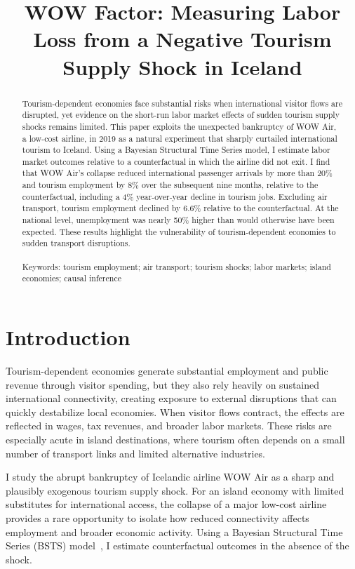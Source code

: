 \documentclass[12pt]{article}
\title{WOW Factor: Measuring Labor Loss from a Negative Tourism Supply Shock in Iceland}
\date{}
\begin{document}
\maketitle
\clearpage

\begin{abstract}
Tourism-dependent economies face substantial risks when international visitor flows are disrupted, yet evidence on the short-run labor market effects of sudden tourism supply shocks remains limited. This paper exploits the unexpected bankruptcy of WOW Air, a low-cost airline, in 2019 as a natural experiment that sharply curtailed international tourism to Iceland. Using a Bayesian Structural Time Series model, I estimate labor market outcomes relative to a counterfactual in which the airline did not exit. I find that WOW Air’s collapse reduced international passenger arrivals by more than 20\% and tourism employment by 8\% over the subsequent nine months, relative to the counterfactual, including a 4\% year-over-year decline in tourism jobs. Excluding air transport, tourism employment declined by 6.6\% relative to the counterfactual. At the national level, unemployment was nearly 50\% higher than would otherwise have been expected. These results highlight the vulnerability of tourism-dependent economies to sudden transport disruptions.
\\ 
\\
Keywords: tourism employment; air transport; tourism shocks; labor markets; island economies; causal inference
\end{abstract}
\clearpage

\section{Introduction}\label{sec:Introduction}
Tourism-dependent economies generate substantial employment and public revenue through visitor spending, but they also rely heavily on sustained international connectivity, creating exposure to external disruptions that can quickly destabilize local economies. When visitor flows contract, the effects are reflected in wages, tax revenues, and broader labor markets. These risks are especially acute in island destinations, where tourism often depends on a small number of transport links and limited alternative industries.

I study the abrupt bankruptcy of Icelandic airline WOW Air as a sharp and plausibly exogenous tourism supply shock. For an island economy with limited substitutes for international access, the collapse of a major low-cost airline provides a rare opportunity to isolate how reduced connectivity affects employment and broader economic activity. Using a Bayesian Structural Time Series (BSTS) model~\citep{brodersen_2015_inferring}, I estimate counterfactual outcomes in the absence of the shock.
\end{document}
